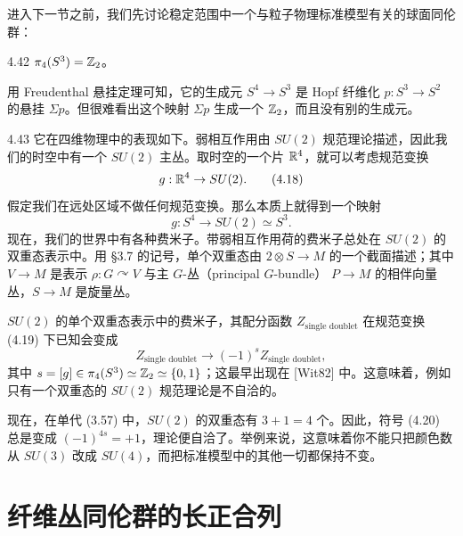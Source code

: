 进入下一节之前，我们先讨论稳定范围中一个与粒子物理标准模型有关的球面同伦群：

\begin{example}{4.42}
$\pi_4(S^3)=\mathbb{Z}_2$。
\end{example}

用 Freudenthal 悬挂定理可知，它的生成元 $S^4\to S^3$ 是 Hopf 纤维化 $p:S^3\to S^2$ 的悬挂 $\Sigma p$。但很难看出这个映射 $\Sigma p$ 生成一个 $\mathbb{Z}_2$，而且没有别的生成元。


\begin{remark}{4.43}
它在四维物理中的表现如下。弱相互作用由 $SU(2)$ 规范理论描述，因此我们的时空中有一个 $SU(2)$ 主丛。取时空的一个片 $\mathbb{R}^4$，就可以考虑规范变换
\begin{equation}
g:\mathbb{R}^4\to SU(2).
\tag{4.18}
\end{equation}
假定我们在远处区域不做任何规范变换。那么本质上就得到一个映射
\begin{equation}
g:S^4\to SU(2)\simeq S^3.
\tag{4.19}
\end{equation}
现在，我们的世界中有各种费米子。带弱相互作用荷的费米子总处在 $SU(2)$ 的双重态表示中。用 §3.7 的记号，单个双重态由 $2\otimes S\to M$ 的一个截面描述；其中 $V\to M$ 是表示 $\rho:G\curvearrowright V$ 与主 $G$-丛（principal $G$-bundle） $P\to M$ 的相伴向量丛，$S\to M$ 是旋量丛。

$SU(2)$ 的单个双重态表示中的费米子，其配分函数 $Z_{\text{single doublet}}$ 在规范变换 (4.19) 下已知会变成
\begin{equation}
Z_{\text{single doublet}}\to(-1)^sZ_{\text{single doublet}},
\tag{4.20}
\end{equation}
其中 $s=[g]\in\pi_4(S^3)\simeq\mathbb{Z}_2\simeq\{0,1\}$；这最早出现在 [Wit82] 中。这意味着，例如只有一个双重态的 $SU(2)$ 规范理论是不自洽的。

现在，在单代 (3.57) 中，$SU(2)$ 的双重态有 $3+1=4$ 个。因此，符号 (4.20) 总是变成 $(-1)^{4s}=+1$，理论便自洽了。举例来说，这意味着你不能只把颜色数从 $SU(3)$ 改成 $SU(4)$，而把标准模型中的其他一切都保持不变。
\end{remark}


\section{纤维丛同伦群的长正合列}

